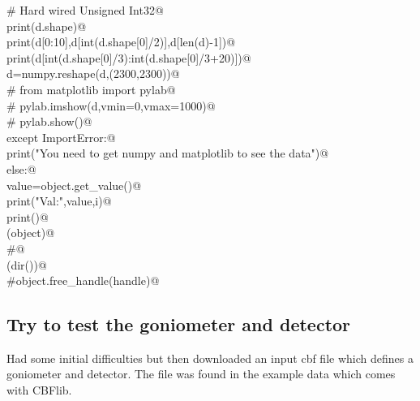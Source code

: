 \documentclass[10pt,a4paper,twoside,notitlepage]{article}
\begin{document}
\begin{flushleft}
\begin{minipage}{\linewidth}
\begin{list}{}{}
\mbox{}\verb@                   # Hard wired Unsigned Int32@\\
\mbox{}\verb@                   print(d.shape)@\\
\mbox{}\verb@                   print(d[0:10],d[int(d.shape[0]/2)],d[len(d)-1])@\\
\mbox{}\verb@                   print(d[int(d.shape[0]/3):int(d.shape[0]/3+20)])@\\
\mbox{}\verb@                   d=numpy.reshape(d,(2300,2300))@\\
\mbox{}\verb@#                   from matplotlib import pylab@\\
\mbox{}\verb@#                   pylab.imshow(d,vmin=0,vmax=1000)@\\
\mbox{}\verb@#                   pylab.show()@\\
\mbox{}\verb@                except ImportError:@\\
\mbox{}\verb@                   print("You need to get numpy and matplotlib to see the data")@\\
\mbox{}\verb@            else:@\\
\mbox{}\verb@                value=object.get_value()@\\
\mbox{}\verb@                print("Val:",value,i)@\\
\mbox{}\verb@    print()@\\
\mbox{}\verb@del(object)@\\
\mbox{}\verb@#@\\
\mbox{}\verb@print(dir())@\\
\mbox{}\verb@#object.free_handle(handle)@\\
\mbox{}\verb@@{\NWsep}
\end{list}
\vspace{-1.5ex}
\footnotesize
\begin{list}{}{\setlength{\itemsep}{-\parsep}\setlength{\itemindent}{-\leftmargin}}

\item{}
\end{list}
\end{minipage}\vspace{4ex}
\end{flushleft}
\subsection{Try to test the goniometer and detector}

Had some initial difficulties but then downloaded an input cbf file which defines 
a goniometer and detector. 
The file was found in the example data which comes with CBFlib.
\end{document}
